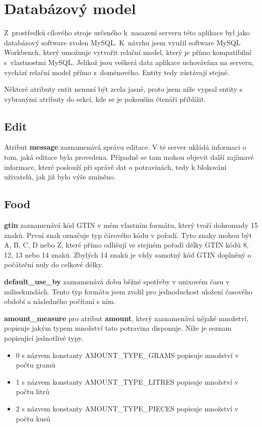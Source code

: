 \documentclass[thesis=B,czech]{FITthesis}[2013/10/20]
\begin{document}
\section{Databázový model}

Z~prostředků cílového stroje určeného k~nasazení serveru této aplikace byl jako databázový software zvolen MySQL. K~návrhu jsem využil software MySQL Workbench, který umožnuje vytvořit relační model, který je přímo kompatibilní s~vlastnostmi MySQL. Jelikož jsou veškerá data aplikace uchovávána na serveru, vychází relační model přímo z~doménového. Entity tedy zůstávají stejné.

Některé atributy entit nemusí být zcela jasné, proto jsem níže vypsal entity s vybranými atributy do sekcí, kde se je pokouším čtenáři přiblížit.

\subsection{Edit}

Atribut \textbf{message} zaznamenává zprávu editace. V té server ukládá informaci o tom, jaká editace byla provedena. Případně se tam mohou objevit další zajímavé informace, které poslouží při správě dat o potravinách, tedy k blokování uživatelů, jak již bylo výše zmíněno.

\subsection{Food}

\textbf{gtin} zaznamenává kód GTIN v mém vlastním formátu, který tvoří dohromady 15 znaků. První znak označuje typ čárového kódu v pořadí. Tyto znaky mohou být A, B, C, D nebo Z, které přímo odlišují ve stejném pořadí délky GTIN kódů 8, 12, 13 nebo 14 znaků. Zbylých 14 znaků je vždy samotný kód GTIN doplněný o počáteční nuly do celkové délky.

\textbf{default\_use\_by} zaznamenává dobu běžné spotřeby v unixovém času v milisekundách. Tento typ formátu jsem zvolil pro jednoduchost uložení časového období a následného počítaní s ním.

\textbf{amount\_measure} pro atribut \textbf{amount}, který zaznamenává nějaké množství, popisuje jakým typem množství tato potravina disponuje. Níže je seznam popisující jednotlivé typy.

\begin{itemize}
  \item 0 s názvem konstanty AMOUNT\_TYPE\_GRAMS popisuje množství v počtu gramů
  \item 1 s názvem konstanty AMOUNT\_TYPE\_LITRES popisuje množství v počtu litrů
  \item 2 s názvem konstanty AMOUNT\_TYPE\_PIECES popisuje množství v počtu kusů
\end{itemize}
\end{document}
